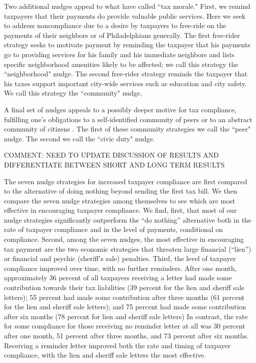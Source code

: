\documentclass[12pt]{article}
\begin{document}
Two additional nudges appeal to what  have called
``tax morale."  First, we remind taxpayers that their payments do
provide valuable public services.  Here we seek to address
noncompliance due to a desire by taxpayers to free-ride on the
payments of their neighbors or of Philadelphians generally.  The first
free-rider strategy seeks to motivate payment by reminding the
taxpayer that his payments go to providing services for his family and
his immediate neighbors and lists specific neighborhood amenities
likely to be affected; we call this strategy the ``neighborhood"
nudge.  The second free-rider strategy reminds the taxpayer that his
taxes support important city-wide services such as education and city
safety. We call this strategy the ``community" nudge.
  
A final set of nudges appeals to a possibly deeper motive for tax
compliance, fulfilling one's obligations to a self-identified
community of peers \cite{Posner-00} or to an abstract community of
citizens \cite{Rawls-71}.  The first of these community strategies we
call the ``peer" nudge.  The second we call the ``civic duty" nudge.
  
 \noindent COMMENT: NEED TO UPDATE DISCUSSION OF RESULTS AND DIFFERENTIATE BETWEEN SHORT AND LONG TERM RESULTS
  
The seven nudge strategies for increased taxpayer compliance are first
compared to the alternative of doing nothing beyond sending the first
tax bill.  We then compare the seven nudge strategies among themselves
to see which are most effective in encouraging taxpayer compliance.
We find, first, that  most of our nudge strategies significantly
outperform the ``do nothing'' alternative both in the rate of
taxpayer compliance and in the level of payments, conditional on
compliance.  Second, among the seven nudges, the most effective in
encouraging tax payment are the two economic strategies that threaten
large financial (``lien'') or financial and psychic (sheriff's
sale) penalties.  Third, the level of taxpayer compliance improved
over time, with no further reminders.  After one month, approximately
36 percent of all taxpayers receiving a letter had made some
contribution towards their tax liabilities (39 percent for the lien
and sheriff sale letters); 55 percent had made some contribution after
three months (61 percent for the lien and sheriff sale letters); and
75 percent had made some contribution after six months (78 percent for
lien and sheriff sale letters) In contrast, the rate for some
compliance for those receiving no reminder letter at all was 30
percent after one month, 51 percent after three months, and 73 percent
after six months.  Receiving a reminder letter improved both the rate
and timing of taxpayer compliance, with the lien and sheriff sale
letters the most effective.
  
\end{document}
